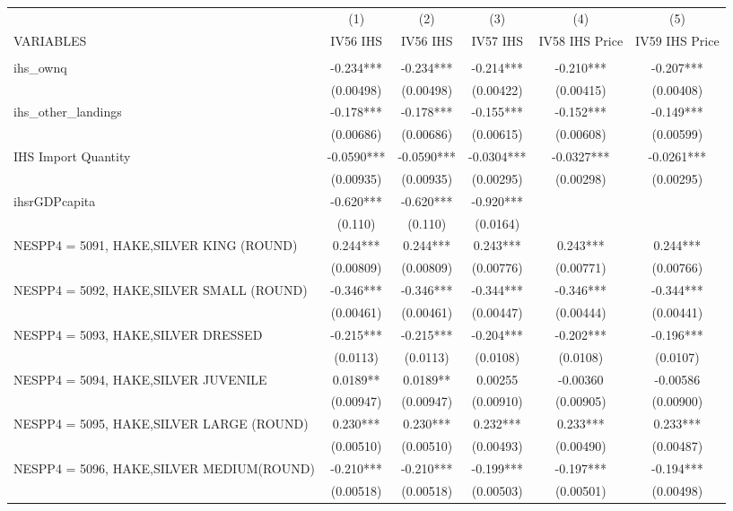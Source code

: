 \begin{tabular}{lccccc} \hline
 & (1) & (2) & (3) & (4) & (5) \\
VARIABLES & IV56 IHS & IV56 IHS & IV57 IHS & IV58 IHS Price & IV59 IHS Price \\ \hline
 &  &  &  &  &  \\
ihs\_ownq & -0.234*** & -0.234*** & -0.214*** & -0.210*** & -0.207*** \\
 & (0.00498) & (0.00498) & (0.00422) & (0.00415) & (0.00408) \\
ihs\_other\_landings & -0.178*** & -0.178*** & -0.155*** & -0.152*** & -0.149*** \\
 & (0.00686) & (0.00686) & (0.00615) & (0.00608) & (0.00599) \\
IHS Import Quantity & -0.0590*** & -0.0590*** & -0.0304*** & -0.0327*** & -0.0261*** \\
 & (0.00935) & (0.00935) & (0.00295) & (0.00298) & (0.00295) \\
ihsrGDPcapita & -0.620*** & -0.620*** & -0.920*** &  &  \\
 & (0.110) & (0.110) & (0.0164) &  &  \\
NESPP4 = 5091, HAKE,SILVER KING (ROUND) & 0.244*** & 0.244*** & 0.243*** & 0.243*** & 0.244*** \\
 & (0.00809) & (0.00809) & (0.00776) & (0.00771) & (0.00766) \\
NESPP4 = 5092, HAKE,SILVER SMALL (ROUND) & -0.346*** & -0.346*** & -0.344*** & -0.346*** & -0.344*** \\
 & (0.00461) & (0.00461) & (0.00447) & (0.00444) & (0.00441) \\
NESPP4 = 5093, HAKE,SILVER DRESSED & -0.215*** & -0.215*** & -0.204*** & -0.202*** & -0.196*** \\
 & (0.0113) & (0.0113) & (0.0108) & (0.0108) & (0.0107) \\
NESPP4 = 5094, HAKE,SILVER JUVENILE & 0.0189** & 0.0189** & 0.00255 & -0.00360 & -0.00586 \\
 & (0.00947) & (0.00947) & (0.00910) & (0.00905) & (0.00900) \\
NESPP4 = 5095, HAKE,SILVER LARGE (ROUND) & 0.230*** & 0.230*** & 0.232*** & 0.233*** & 0.233*** \\
 & (0.00510) & (0.00510) & (0.00493) & (0.00490) & (0.00487) \\
NESPP4 = 5096, HAKE,SILVER MEDIUM(ROUND) & -0.210*** & -0.210*** & -0.199*** & -0.197*** & -0.194*** \\
 & (0.00518) & (0.00518) & (0.00503) & (0.00501) & (0.00498) \\

\end{tabular}
